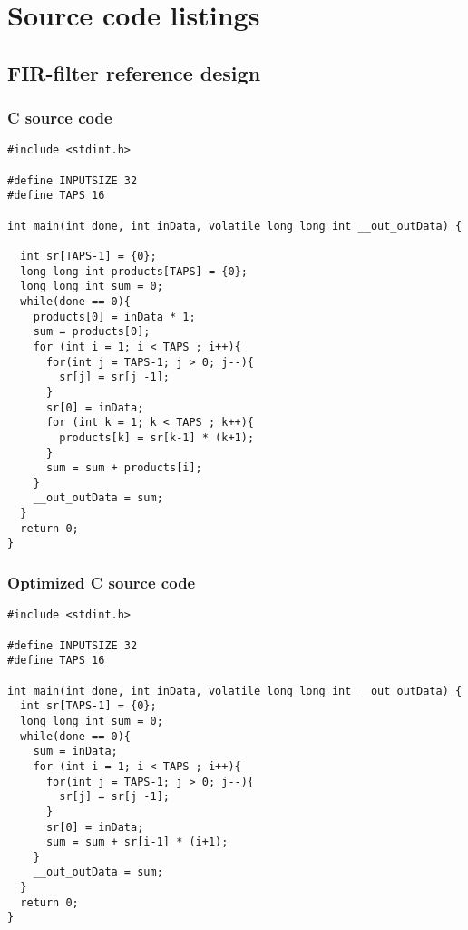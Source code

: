 \chapter{Source code listings}
\section{\label{sec:sourcecode}FIR-filter reference design}
\subsection{\label{subsec:cfircode}C source code}
\lstset{language=C,style=CStyle}
\begin{lstlisting}
#include <stdint.h>

#define INPUTSIZE 32
#define TAPS 16

int main(int done, int inData, volatile long long int __out_outData) {

  int sr[TAPS-1] = {0};
  long long int products[TAPS] = {0};
  long long int sum = 0;
  while(done == 0){
    products[0] = inData * 1;
    sum = products[0];
    for (int i = 1; i < TAPS ; i++){
      for(int j = TAPS-1; j > 0; j--){
        sr[j] = sr[j -1];
      }
      sr[0] = inData;
      for (int k = 1; k < TAPS ; k++){
        products[k] = sr[k-1] * (k+1);
      }
      sum = sum + products[i];
    }
    __out_outData = sum;
  }
  return 0;
}
\end{lstlisting}
\clearpage
\subsection{\label{subsec:cfircode2}Optimized C source code}
\begin{lstlisting}
#include <stdint.h>

#define INPUTSIZE 32
#define TAPS 16

int main(int done, int inData, volatile long long int __out_outData) {
  int sr[TAPS-1] = {0};
  long long int sum = 0;
  while(done == 0){
    sum = inData;
    for (int i = 1; i < TAPS ; i++){
      for(int j = TAPS-1; j > 0; j--){
        sr[j] = sr[j -1];
      }
      sr[0] = inData;
      sum = sum + sr[i-1] * (i+1);
    }
    __out_outData = sum;
  }
  return 0;
}
\end{lstlisting}
\clearpage
